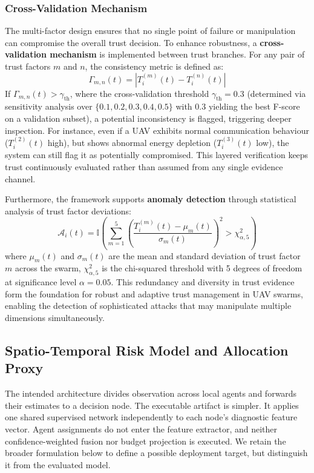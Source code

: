 \documentclass[notspecified,article,submit,moreauthors]{Definitions/mdpi}
\begin{document}
\subsubsection{Cross-Validation Mechanism}
The multi-factor design ensures that no single point of failure or manipulation can compromise the overall trust decision. To enhance robustness, a \textbf{cross-validation mechanism} is implemented between trust branches. For any pair of trust factors $m$ and $n$, the consistency metric is defined as:
\begin{equation}\label{eq:consistency}
\Gamma_{m,n}(t) = \left| T_i^{(m)}(t) - T_i^{(n)}(t) \right|
\end{equation}
If $\Gamma_{m,n}(t) > \gamma_{\text{th}}$, where the cross-validation threshold $\gamma_{\text{th}} = 0.3$ (determined via sensitivity analysis over $\{0.1, 0.2, 0.3, 0.4, 0.5\}$ with $0.3$ yielding the best F-score on a validation subset), a potential inconsistency is flagged, triggering deeper inspection. For instance, even if a UAV exhibits normal communication behaviour ($T_i^{(2)}(t)$ high), but shows abnormal energy depletion ($T_i^{(3)}(t)$ low), the system can still flag it as potentially compromised. This layered verification keeps trust continuously evaluated rather than assumed from any single evidence channel.

Furthermore, the framework supports \textbf{anomaly detection} through statistical analysis of trust factor deviations:
\begin{equation}\label{eq:anomaly}
\mathcal{A}_i(t) = \mathbb{I}\left( \sum_{m=1}^{5} \left( \frac{T_i^{(m)}(t) - \mu_m(t)}{\sigma_m(t)} \right)^2 > \chi^2_{\alpha,5} \right)
\end{equation}
where $\mu_m(t)$ and $\sigma_m(t)$ are the mean and standard deviation of trust factor $m$ across the swarm, $\chi^2_{\alpha,5}$ is the chi-squared threshold with 5 degrees of freedom at significance level $\alpha = 0.05$. This redundancy and diversity in trust evidence form the foundation for robust and adaptive trust management in UAV swarms, enabling the detection of sophisticated attacks that may manipulate multiple dimensions simultaneously.

\subsection{Spatio-Temporal Risk Model and Allocation Proxy}
\label{sec:system_design}
The intended architecture divides observation across local agents and forwards their estimates to a decision node. The executable artifact is simpler. It applies one shared supervised network independently to each node's diagnostic feature vector. Agent assignments do not enter the feature extractor, and neither confidence-weighted fusion nor budget projection is executed. We retain the broader formulation below to define a possible deployment target, but distinguish it from the evaluated model.
\end{document}
